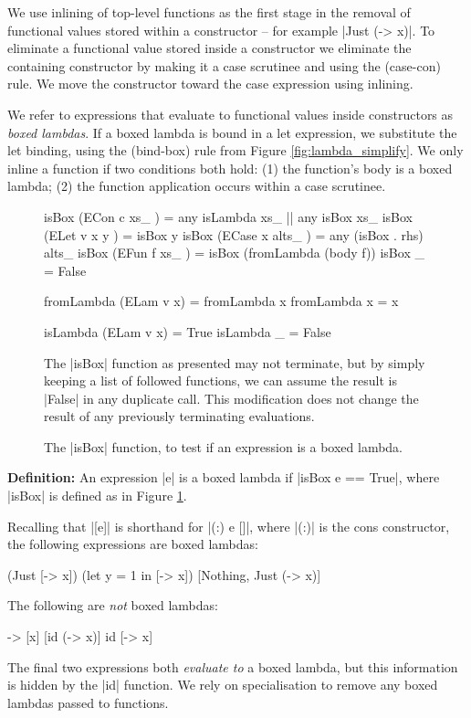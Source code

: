 \documentclass[preprint]{sigplanconf}
\newenvironment{definition}
    {\smallskip
     \noindent\textbf{Definition:}}
    {\noexample}
\begin{document}
We use inlining of top-level functions as the first stage in the removal of functional values stored within a constructor -- for example |Just (\x -> x)|. To eliminate a functional value stored inside a constructor we eliminate the containing constructor by making it a case scrutinee and using the (case-con) rule. We move the constructor toward the case expression using inlining.

We refer to expressions that evaluate to functional values inside constructors as \textit{boxed lambdas}. If a boxed lambda is bound in a let expression, we substitute the let binding, using the (bind-box) rule from Figure \ref{fig:lambda_simplify}. We only inline a function if two conditions both hold: (1) the function's body is a boxed lambda; (2) the function application occurs within a case scrutinee.

\begin{figure}
\begin{code}
isBox (ECon c xs_     )  =  any isLambda xs_ ||  any isBox xs_
isBox (ELet v x y     )  =  isBox y
isBox (ECase x alts_  )  =  any (isBox . rhs) alts_
isBox (EFun f xs_     )  =  isBox (fromLambda (body f))
isBox _                  =  False

fromLambda (ELam v x)  = fromLambda x
fromLambda x           = x

isLambda (ELam v x)  = True
isLambda _           = False
\end{code}

The |isBox| function as presented may not terminate, but by simply keeping a list of followed functions, we can assume the result is |False| in any duplicate call. This modification does not change the result of any previously terminating evaluations.
\caption{The |isBox| function, to test if an expression is a boxed lambda.}
\label{fig:boxed_lambda}
\end{figure}

\begin{definition}
An expression |e| is a boxed lambda if |isBox e == True|, where |isBox| is defined as in Figure \ref{fig:boxed_lambda}.
\end{definition}

\begin{example}
Recalling that |[e]| is shorthand for |(:) e []|, where |(:)| is the cons constructor, the following expressions are boxed lambdas:

\ignore\begin{code}
[\x -> x]
(Just [\x -> x])
(let y = 1 in [\x -> x])
[Nothing, Just (\x -> x)]
\end{code}

\noindent The following are \textit{not} boxed lambdas:

\ignore\begin{code}
\x -> [x]
[id (\x -> x)]
id [\x -> x]
\end{code}

The final two expressions both \textit{evaluate to} a boxed lambda, but this information is hidden by the |id| function. We rely on specialisation to remove any boxed lambdas passed to functions.
\end{example}
\end{document}
